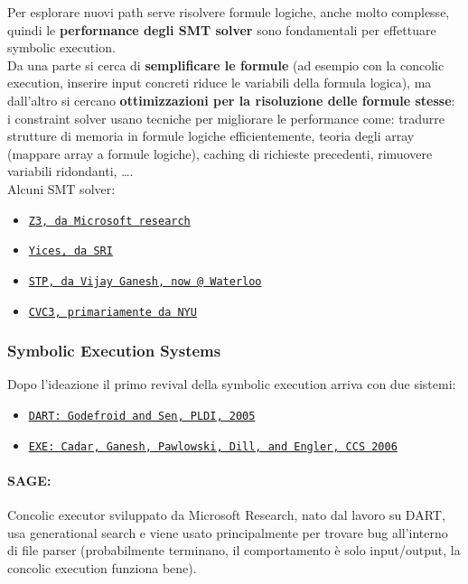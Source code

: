Per esplorare nuovi path serve risolvere formule logiche, anche molto complesse, quindi le \textbf{performance degli SMT solver} sono fondamentali per effettuare symbolic execution.\\

Da una parte si cerca di \textbf{semplificare le formule} (ad esempio con la concolic execution, inserire input concreti riduce le variabili della formula logica), ma dall'altro si cercano \textbf{ottimizzazioni per la risoluzione delle formule stesse}: i constraint solver usano tecniche per migliorare le performance come: tradurre strutture di memoria in formule logiche efficientemente, teoria degli array (mappare array a formule logiche), caching di richieste precedenti, rimuovere variabili ridondanti, \dots.\\

Alcuni SMT solver:
\begin{itemize}
	\item \href{http://z3.codeplex.com/}{\texttt{Z3, da Microsoft research}}
	\item \href{http://yices.csl.sri.com/}{\texttt{Yices, da SRI}}
	\item \href{https://sites.google.com/site/stpfastprover/}{\texttt{STP, da Vijay Ganesh, now @ Waterloo}}
	\item \href{http://www.cs.nyu.edu/acsys/cvc3/}{\texttt{CVC3, primariamente da NYU}}
\end{itemize}

\newpage

\subsubsection{Symbolic Execution Systems}

Dopo l'ideazione il primo revival della symbolic execution arriva con due sistemi:
\begin{itemize}
	\item \href{https://web.eecs.umich.edu/~weimerw/590/reading/p213-godefroid.pdf}{\texttt{DART: Godefroid and Sen, PLDI, 2005}}
	\item \href{https://www.cs.umd.edu/class/fall2023/cmsc614/papers/exe.pdf}{\texttt{EXE: Cadar, Ganesh, Pawlowski, Dill, and Engler, CCS 2006}}
\end{itemize}

\paragraph{SAGE:} Concolic executor sviluppato da Microsoft Research, nato dal lavoro su DART, usa generational search e viene usato principalmente per trovare bug all'interno di file parser (probabilmente terminano, il comportamento è solo input/output, la concolic execution funziona bene). \\

